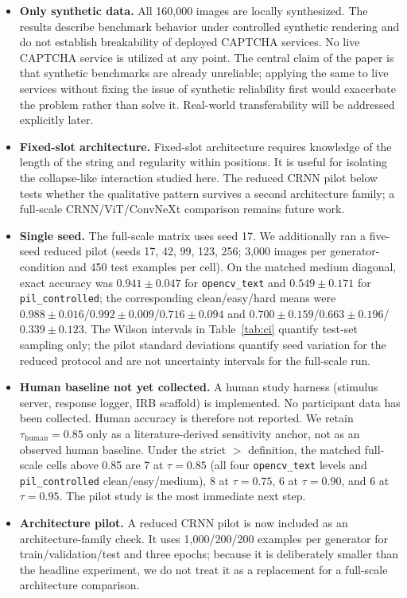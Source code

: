 \documentclass[pdflatex,sn-mathphys-num,iicol]{sn-jnl}
\begin{document}
\begin{itemize}
    \item \textbf{Only synthetic data.} All 160,000 images are locally synthesized. The results describe benchmark behavior under controlled synthetic rendering and do not establish breakability of deployed CAPTCHA services. 
    No live CAPTCHA service is utilized at any point. The central claim of the paper is that 
    synthetic benchmarks are already unreliable; applying the same to live services without fixing 
    the issue of synthetic reliability first would exacerbate the problem rather than solve it.
    Real-world transferability will be addressed explicitly later.

    \item \textbf{Fixed-slot architecture.} Fixed-slot architecture requires knowledge of the length
    of the string and regularity within positions. It is useful for isolating the
    collapse-like interaction studied here. The reduced CRNN pilot below tests
    whether the qualitative pattern survives a second architecture family; a
    full-scale CRNN/ViT/ConvNeXt comparison remains future work.

    \item \textbf{Single seed.} The full-scale matrix uses seed 17. We additionally ran a five-seed reduced pilot (seeds 17, 42, 99, 123, 256; 3,000 images per generator-condition and 450 test examples per cell). On the matched medium diagonal, exact accuracy was $0.941\pm0.047$ for \texttt{opencv\_text} and $0.549\pm0.171$ for \texttt{pil\_controlled}; the corresponding clean/easy/hard means were $0.988\pm0.016$/$0.992\pm0.009$/$0.716\pm0.094$ and $0.700\pm0.159$/$0.663\pm0.196$/$0.339\pm0.123$. The Wilson intervals in Table~\ref{tab:ci} quantify test-set sampling only; the pilot standard deviations quantify seed variation for the reduced protocol and are not uncertainty intervals for the full-scale run.

    \item \textbf{Human baseline not yet collected.} A human study harness
    (stimulus server, response logger, IRB scaffold) is implemented. No
    participant data has been collected. Human accuracy is therefore not reported. We retain $\tau_{\mathrm{human}}=0.85$ only as a literature-derived sensitivity anchor, not as an observed human baseline. Under the strict $>$ definition, the matched full-scale cells above 0.85 are 7 at $\tau=0.85$ (all four \texttt{opencv\_text} levels and \texttt{pil\_controlled} clean/easy/medium), 8 at $\tau=0.75$, 6 at $\tau=0.90$, and 6 at $\tau=0.95$.
    The pilot study is the most immediate next step.

    \item \textbf{Architecture pilot.}
    A reduced CRNN pilot is now included as an architecture-family check. It uses 1,000/200/200 examples per generator for train/validation/test and three epochs; because it is deliberately smaller than the headline experiment, we do not treat it as a replacement for a full-scale architecture comparison.
\end{itemize}
\end{document}
